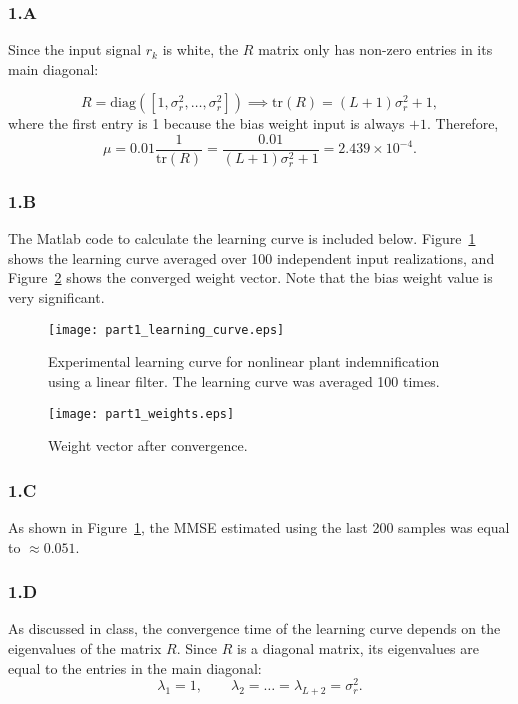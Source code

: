 \subsubsection*{1.A}
Since the input signal $r_k$ is white, the $R$ matrix only has non-zero entries in its main diagonal:

\begin{equation}
R = \mathrm{diag}([1, \sigma^2_r, \ldots, \sigma^2_r]) \implies \mathrm{tr}(R) = (L+1)\sigma^2_r + 1,
\end{equation} 
where the first entry is 1 because the bias weight input is always $+1$. Therefore,
\begin{equation}
\mu = 0.01\frac{1}{\mathrm{tr}(R)} = \frac{0.01}{(L+1)\sigma^2_r + 1} = 2.439\times 10^{-4}.
\end{equation}

\subsubsection*{1.B}
The Matlab code to calculate the learning curve is included below. Figure~\ref{fig:part1-learning-curve} shows the learning curve averaged over 100 independent input realizations, and  Figure~\ref{fig:part1-weights} shows the converged weight vector. Note that the bias weight value is very significant.

\FloatBarrier
\begin{figure}[h!]
	\centering
	\texttt{[image: part1\_learning\_curve.eps]}
	\caption{Experimental learning curve for nonlinear plant indemnification using a linear filter. The learning curve was averaged 100 times.}
	\label{fig:part1-learning-curve}
\end{figure}
\FloatBarrier

\FloatBarrier
\begin{figure}[h!]
	\centering
	\texttt{[image: part1\_weights.eps]}
	\caption{Weight vector after convergence.}
	\label{fig:part1-weights}
\end{figure}
\FloatBarrier

\subsubsection*{1.C}
As shown in Figure~\ref{fig:part1-learning-curve}, the MMSE estimated using the last 200 samples was equal to $\approx 0.051$.

\subsubsection*{1.D}
As discussed in class, the convergence time of the learning curve depends on the eigenvalues of the matrix $R$. Since $R$ is a diagonal matrix, its eigenvalues are equal to the entries in the main diagonal:
\begin{equation}
\lambda_1 = 1, \qquad \lambda_2 = \ldots = \lambda_{L+2} = \sigma_r^2.
\end{equation}

